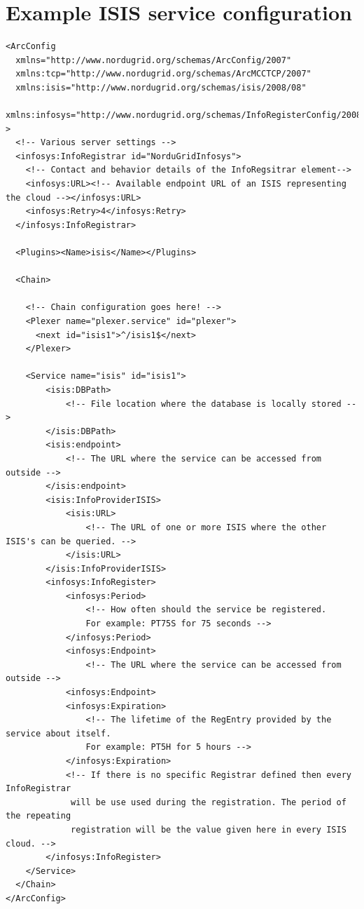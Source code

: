 \documentclass{book}
\begin{document}
\section{Example ISIS service configuration}
\label{annex:example_isis_configuration}
\begin{verbatim}
<ArcConfig
  xmlns="http://www.nordugrid.org/schemas/ArcConfig/2007"
  xmlns:tcp="http://www.nordugrid.org/schemas/ArcMCCTCP/2007"
  xmlns:isis="http://www.nordugrid.org/schemas/isis/2008/08"
  xmlns:infosys="http://www.nordugrid.org/schemas/InfoRegisterConfig/2008"
>
  <!-- Various server settings -->
  <infosys:InfoRegistrar id="NorduGridInfosys">
    <!-- Contact and behavior details of the InfoRegsitrar element-->
    <infosys:URL><!-- Available endpoint URL of an ISIS representing the cloud --></infosys:URL>
    <infosys:Retry>4</infosys:Retry>
  </infosys:InfoRegistrar>

  <Plugins><Name>isis</Name></Plugins>

  <Chain>

    <!-- Chain configuration goes here! -->
    <Plexer name="plexer.service" id="plexer">
      <next id="isis1">^/isis1$</next>
    </Plexer>

    <Service name="isis" id="isis1">
        <isis:DBPath>
            <!-- File location where the database is locally stored -->
        </isis:DBPath>
        <isis:endpoint>
            <!-- The URL where the service can be accessed from outside -->
        </isis:endpoint>
        <isis:InfoProviderISIS>
            <isis:URL>
                <!-- The URL of one or more ISIS where the other ISIS's can be queried. -->
            </isis:URL>
        </isis:InfoProviderISIS>
        <infosys:InfoRegister>
            <infosys:Period>
                <!-- How often should the service be registered. 
                For example: PT75S for 75 seconds -->
            </infosys:Period>
            <infosys:Endpoint>
                <!-- The URL where the service can be accessed from outside -->
            <infosys:Endpoint>
            <infosys:Expiration>
                <!-- The lifetime of the RegEntry provided by the service about itself.
                For example: PT5H for 5 hours -->
            </infosys:Expiration>
            <!-- If there is no specific Registrar defined then every InfoRegistrar
             will be use used during the registration. The period of the repeating 
             registration will be the value given here in every ISIS cloud. -->
        </infosys:InfoRegister>
    </Service>
  </Chain>
</ArcConfig>

\end{verbatim}




\end{document}
